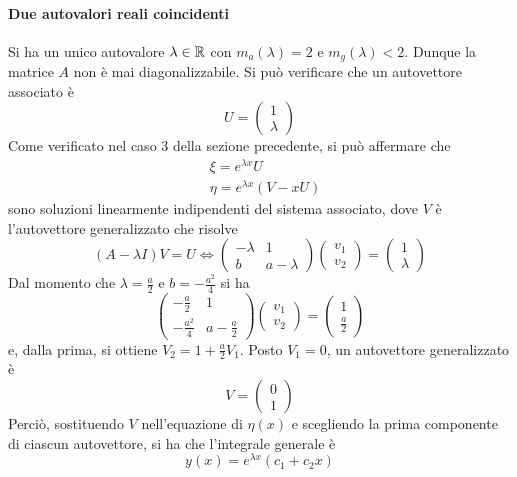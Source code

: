 \paragraph{Due autovalori reali coincidenti}
Si ha un unico autovalore $\lambda \in \mathbb{R}$ con $m_a(\lambda)=2$ e $m_g(\lambda)<2$. Dunque la matrice $A$ non è mai diagonalizzabile. Si può verificare che un autovettore associato è 
\begin{equation}
    U= \begin{pmatrix}
        1\\
        \lambda
    \end{pmatrix}
\end{equation}
Come verificato nel caso 3 della sezione precedente, si può affermare che 
\begin{align}
    &\xi=e^{\lambda
    x}U\\
    &\eta=e^{\lambda x}(V-xU)
\end{align}
sono soluzioni linearmente indipendenti del sistema associato, dove $V$ è l'autovettore generalizzato che risolve 
\begin{equation}
    (A-\lambda I)V=U \iff \begin{pmatrix}
        -\lambda & 1\\
        b & a-\lambda
    \end{pmatrix}
    \begin{pmatrix}
        v_1\\
        v_2
    \end{pmatrix}= \begin{pmatrix}
        1\\
        \lambda
    \end{pmatrix}
\end{equation}
Dal momento che $\lambda= \tfrac{a}{2}$ e $b=-\tfrac{a^2}{4}$ si ha
\begin{equation}
    \begin{pmatrix}
        -\frac{a}{2} & 1\\
        -\frac{a^2}{4} & a-\frac{a}{2}
    \end{pmatrix}
    \begin{pmatrix}
        v_1\\
        v_2
    \end{pmatrix}= \begin{pmatrix}
        1\\
        \frac{a}{2}
        \end{pmatrix}
\end{equation}
e, dalla prima, si ottiene $V_2=1+\tfrac{a}{2}V_1$. Posto $V_1=0$, un autovettore generalizzato è
\begin{equation}
    V=\begin{pmatrix}
        0\\
        1
    \end{pmatrix}
\end{equation}
Perciò, sostituendo $V$ nell'equazione di $\eta(x)$ e scegliendo la prima componente di ciascun autovettore, si ha che l'integrale generale è
\begin{equation}
y(x)= e^{\lambda x}(c_1+c_2 x)    
\end{equation}

